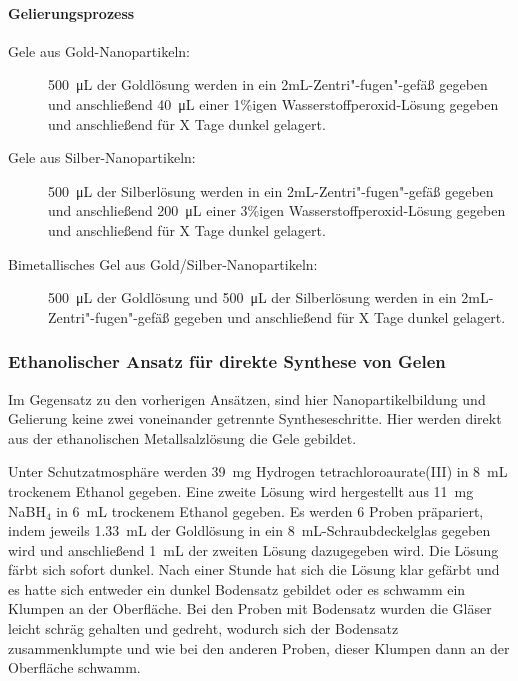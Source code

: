 			\paragraph{Gelierungsprozess}
			    \begin{description}
			    \item[Gele aus Gold-Nanopartikeln:]
			    \SI{500}{\micro\liter} der Goldlösung werden in ein 2mL-Zentri"-fugen"-gefäß gegeben und anschließend \SI{40}{\micro\liter} einer 1\%igen Wasserstoffperoxid-Lösung gegeben und anschließend für X Tage dunkel gelagert.
			    \item[Gele aus Silber-Nanopartikeln:]
			    \SI{500}{\micro\liter} der Silberlösung werden in ein 2mL-Zentri"-fugen"-gefäß gegeben und anschließend \SI{200}{\micro\liter} einer 3\%igen Wasserstoffperoxid-Lösung gegeben und anschließend für X Tage dunkel gelagert.
			    \item[Bimetallisches Gel aus Gold/Silber-Nanopartikeln:]
			    \SI{500}{\micro\liter} der Goldlösung und 	\SI{500}{\micro\liter} der Silberlösung werden in ein 2mL-Zentri"-fugen"-gefäß gegeben und anschließend für X Tage dunkel gelagert.
			    \end{description}
			    
			
		\subsubsection{Ethanolischer Ansatz für direkte Synthese von Gelen}
			Im Gegensatz zu den vorherigen Ansätzen, sind hier Nanopartikelbildung und Gelierung keine zwei voneinander getrennte Syntheseschritte.
			Hier werden direkt aus der ethanolischen Metallsalzlösung die Gele gebildet. \autocite{Georgi2019}
			
			Unter Schutzatmosphäre werden \SI{39}{\milli\gram} Hydrogen tetrachloroaurate(III) in \SI{8}{\milli\liter} trockenem Ethanol gegeben.
			Eine zweite Lösung wird hergestellt aus \SI{11}{\milli\gram} NaBH$_4$ in \SI{6}{\milli\liter} trockenem Ethanol gegeben.
			Es werden 6 Proben präpariert, indem jeweils \SI{1,33}{\milli\liter} der Goldlösung in ein \SI{8}{\milli\liter}-Schraubdeckelglas gegeben wird und anschließend \SI{1}{\milli\liter} der zweiten Lösung dazugegeben wird.
			Die Lösung färbt sich sofort dunkel.
			Nach einer Stunde hat sich die Lösung klar gefärbt und es hatte sich entweder ein dunkel Bodensatz gebildet oder es schwamm ein Klumpen an der Oberfläche.
			Bei den Proben mit Bodensatz wurden die Gläser leicht schräg gehalten und gedreht, wodurch sich der Bodensatz zusammenklumpte und wie bei den anderen Proben, dieser Klumpen dann an der Oberfläche schwamm.  
			
